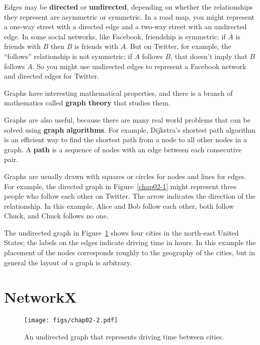 \documentclass[12pt]{book}
\theoremstyle{exercise}
\begin{document}

Edges may be {\bf directed} or {\bf undirected}, depending on whether
the relationships they represent are asymmetric or symmetric.  In a
road map, you might represent a one-way street with a directed edge
and a two-way street with an undirected edge.  In some social
networks, like Facebook, friendship is symmetric: if $A$ is friends
with $B$ then $B$ is friends with $A$.  But on Twitter, for example,
the ``follows'' relationship is not symmetric; if $A$ follows $B$,
that doesn't imply that $B$ follows $A$.  So you might use undirected
edges to represent a Facebook network and directed edges for Twitter.


Graphs have interesting mathematical properties, and
there is a branch of mathematics called {\bf graph theory}
that studies them.


Graphs are also useful, because there are many real world
problems that can be solved using {\bf graph algorithms}.
For example, Dijkstra's shortest path algorithm is an efficient
way to find the shortest path from a node to all
other nodes in a graph.  A {\bf path} is a sequence of nodes
with an edge between each consecutive pair.


Graphs are usually drawn with squares or circles for nodes and lines
for edges.  For example, the directed graph in Figure~\ref{chap02-1}
might represent three people who follow each other on Twitter.
The arrow indicates the direction of the relationship.  In this example, Alice and Bob follow each other, both follow
Chuck, and Chuck follows no one.


The undirected graph in Figure~\ref{chap02-2} shows four cities
in the north-east United States; the labels on the edges
indicate driving time in hours.
In this example the placement of the nodes corresponds
roughly to the geography of the cities, but in general the layout
of a graph is arbitrary.



\section{NetworkX}

\begin{figure}
\centerline{\texttt{[image: figs/chap02-2.pdf]}}
\caption{An undirected graph that represents driving time between cities.}
\label{chap02-2}
\end{figure}
\end{document}
